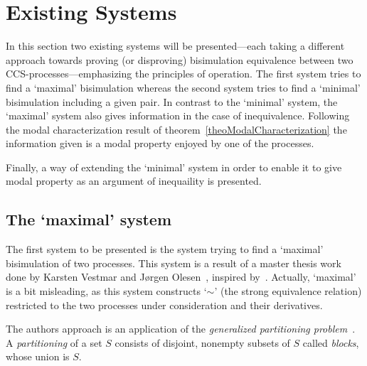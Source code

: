 
\chapter[Existing Systems]{Existing Systems}\label{chapExisting}

In this section two existing systems will be presented---each taking a different approach towards proving (or disproving) bisimulation equivalence between two CCS-processes---emphasizing the principles of operation. The first system tries to find a `maximal' bisimulation whereas the second system tries to find a `minimal' bisimulation including a given pair. In contrast to the `minimal' system, the `maximal' system also gives information in the case of inequivalence. Following the modal characterization result of theorem~\ref{theoModalCharacterization} the information given is a modal property enjoyed by one of the processes.

Finally, a way of extending the `minimal' system in order to enable it to give modal property as an argument of inequaility is presented.


\section{The `maximal' system}
The first system to be presented is the system trying to find a `maximal' bisimulation of two processes. This system is a result of a master thesis work done by Karsten Vestmar and J\o rgen Olesen~\cite{VestmarOlesen}, inspired by~\cite{Larsen}. Actually, `maximal' is a bit misleading, as this system constructs `$\sim$' (the strong equivalence relation) restricted to the two processes under consideration and their derivatives.

The authors approach is an application of the {\em generalized partitioning problem\/}~\cite{Larsen}. A {\em partitioning\/} of a set $S$ consists of disjoint, nonempty subsets of $S$ called {\em blocks\/}, whose union is $S$.

